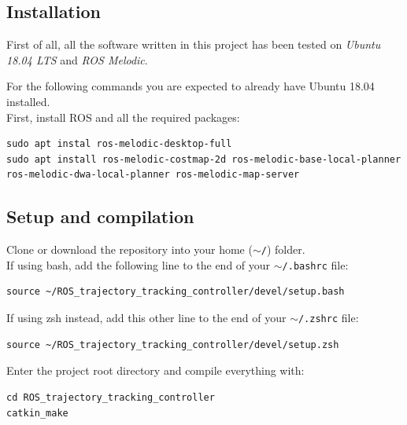 \documentclass[11pt,a4paper]{article}
\begin{document}

\subsection{Installation}

First of all, all the software written in this project has been tested on \textit{Ubuntu 18.04 LTS}
and \textit{ROS Melodic}.

For the following commands you are expected to already have Ubuntu 18.04 installed.\\

First, install ROS and all the required packages:

\begin{lstlisting}
sudo apt instal ros-melodic-desktop-full
sudo apt install ros-melodic-costmap-2d ros-melodic-base-local-planner ros-melodic-dwa-local-planner ros-melodic-map-server
\end{lstlisting}



\subsection{Setup and compilation}

Clone or download the repository into your home (\texttt{$\sim$/}) folder.\\

If using bash, add the following line to the end of your \texttt{$\sim$/.bashrc} file:
\begin{lstlisting}
source ~/ROS_trajectory_tracking_controller/devel/setup.bash
\end{lstlisting}

If using zsh instead, add this other line to the end of your \texttt{$\sim$/.zshrc} file:
\begin{lstlisting}
source ~/ROS_trajectory_tracking_controller/devel/setup.zsh
\end{lstlisting}

Enter the project root directory and compile everything with:
\begin{lstlisting}
cd ROS_trajectory_tracking_controller
catkin_make
\end{lstlisting}


\end{document}
